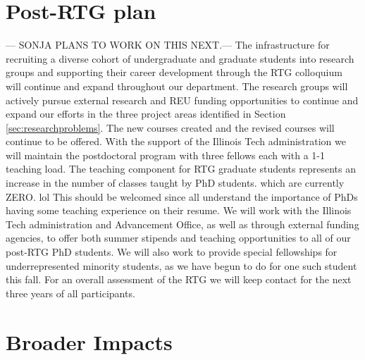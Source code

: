 \documentclass[11pt]{NSFamsart}
\begin{document}
 \section{Post-RTG plan}
 {\color{magenta} --- SONJA PLANS TO WORK ON THIS NEXT.--- }
The infrastructure for recruiting a diverse cohort of undergraduate and graduate students into research groups and supporting their career development through the RTG colloquium will continue and expand throughout our department.  The research groups will actively pursue external research and REU funding opportunities to continue and expand our efforts in the three project areas identified in Section \ref{sec:researchproblems}. The new courses created and the revised courses will continue to be offered.
With the support of the Illinois Tech administration we will maintain the postdoctoral program with three
fellows each with a 1-1 teaching load. The teaching component for RTG graduate students represents
an increase in the number of classes taught by PhD students. {\color{magenta}which are currently ZERO. lol} This should be welcomed since all  understand the importance of PhDs having some teaching experience on their resume.
We will work with the Illinois Tech administration and Advancement Office, as well as through external funding agencies,  to offer both summer stipends and teaching opportunities to all of our post-RTG PhD students.  We will also work to provide special fellowships for underrepresented minority students, as we have begun to do for one such student this fall.
For an overall assessment of the RTG we will keep contact for the next three years of all participants.


\section{Broader Impacts} 


 


 
\end{document}
